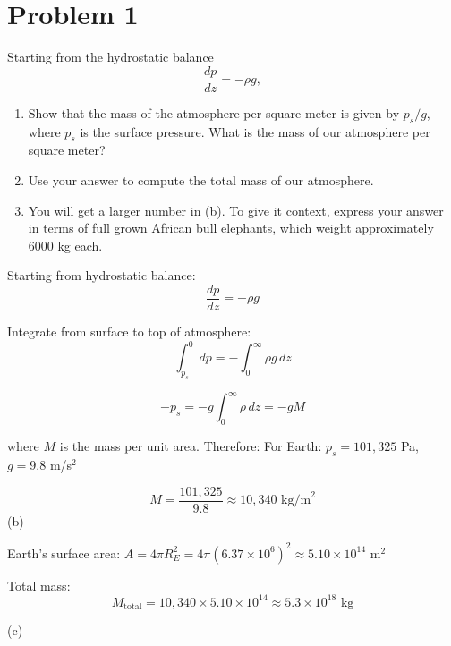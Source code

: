 \documentclass[letterpaper, 11pt]{article}
\newcommand{\1}{\mathds{1}}	%
\theoremstyle{definition}
\begin{document}
\section*{Problem 1}
Starting from the hydrostatic balance
\begin{equation*}
\frac{dp}{dz} = -\rho g,
\end{equation*}

\begin{enumerate}
    \item[(a)] Show that the mass of the atmosphere per square meter is given by $p_s/g$, where $p_s$ is the surface pressure. What is the mass of our atmosphere per square meter?
    
    \item[(b)] Use your answer to compute the total mass of our atmosphere.
    
    \item[(c)] You will get a larger number in (b). To give it context, express your answer in terms of full grown African bull elephants, which weight approximately 6000 kg each.
\end{enumerate}
Starting from hydrostatic balance:
\begin{equation*}
\frac{dp}{dz} = -\rho g
\end{equation*}

Integrate from surface to top of atmosphere:
\begin{equation*}
\int_{p_s}^{0} dp = -\int_{0}^{\infty} \rho g \, dz
\end{equation*}

\begin{equation*}
-p_s = -g \int_{0}^{\infty} \rho \, dz = -gM
\end{equation*}

where $M$ is the mass per unit area. Therefore:
For Earth: $p_s = 101,325$ Pa, $g = 9.8$ m/s$^2$

\begin{equation*}
M = \frac{101,325}{9.8} \approx 10,340 \text{ kg/m}^2
\end{equation*}
 (b)

Earth's surface area: $A = 4\pi R_E^2 = 4\pi (6.37 \times 10^6)^2 \approx 5.10 \times 10^{14}$ m$^2$

Total mass:
\begin{equation*}
M_{\text{total}} = 10,340 \times 5.10 \times 10^{14} \approx 5.3 \times 10^{18} \text{ kg}
\end{equation*}

(c)
\end{document}

